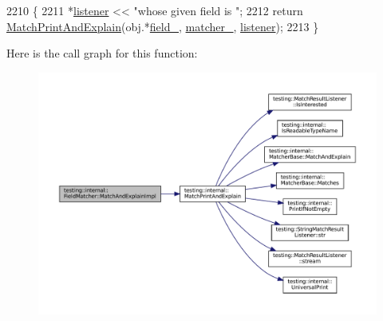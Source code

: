 \begin{DoxyCode}
2210                                                                 \{
2211     *\hyperlink{namespaceinteractive__marker_a0e579ab555212bb5e2c9f8a675b7618a}{listener} << \textcolor{stringliteral}{"whose given field is "};
2212     \textcolor{keywordflow}{return} \hyperlink{namespacetesting_1_1internal_a0821df2611d54c79bac990719ad8a2dd}{MatchPrintAndExplain}(obj.*\hyperlink{classtesting_1_1internal_1_1FieldMatcher_a5937d084f46df4f81948c33688408d31}{field\_}, \hyperlink{classtesting_1_1internal_1_1FieldMatcher_a14eca9e5ca69aabaa9fe288effb1f57c}{matcher\_}, 
      \hyperlink{namespaceinteractive__marker_a0e579ab555212bb5e2c9f8a675b7618a}{listener});
2213   \}
\end{DoxyCode}
Here is the call graph for this function\+:
\nopagebreak
\begin{figure}[H]
\begin{center}
\leavevmode
\includegraphics[width=350pt]{classtesting_1_1internal_1_1FieldMatcher_a3ac8072e68a33f78531d7b1eff96810c_cgraph}
\end{center}
\end{figure}
\mbox{\label{classtesting_1_1internal_1_1FieldMatcher_aade72eefad16c8e6f8db59082b62f3aa}} 
